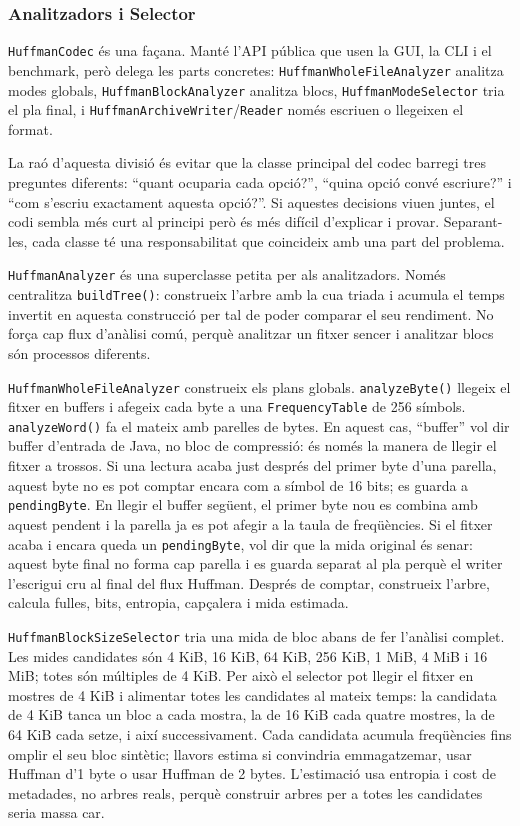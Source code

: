 \documentclass[conference,compsoc]{IEEEtran}
\begin{document}
\subsubsection{Analitzadors i Selector}

\texttt{HuffmanCodec} és una façana. Manté l'API pública que usen la GUI,
la CLI i el benchmark, però delega les parts concretes:
\texttt{HuffmanWholeFileAnalyzer} analitza modes globals,
\texttt{HuffmanBlockAnalyzer} analitza blocs, \texttt{HuffmanModeSelector}
tria el pla final, i \texttt{HuffmanArchiveWriter}/\texttt{Reader}
només escriuen o llegeixen el format.

La raó d'aquesta divisió és evitar que la classe principal del codec
barregi tres preguntes diferents: ``quant ocuparia cada opció?'', ``quina
opció convé escriure?'' i ``com s'escriu exactament aquesta opció?''. Si
aquestes decisions viuen juntes, el codi sembla més curt al principi però
és més difícil d'explicar i provar. Separant-les, cada classe té una
responsabilitat que coincideix amb una part del problema.

\texttt{HuffmanAnalyzer} és una superclasse petita per als analitzadors.
Només centralitza \texttt{buildTree()}: construeix l'arbre amb la cua triada
i acumula el temps invertit en aquesta construcció per tal de poder comparar
el seu rendiment. No força cap flux
d'anàlisi comú, perquè analitzar un fitxer sencer i analitzar blocs són
processos diferents.

\texttt{HuffmanWholeFileAnalyzer} construeix els plans globals.
\texttt{analyzeByte()} llegeix el fitxer en buffers i afegeix cada byte a
una \texttt{FrequencyTable} de 256 símbols. \texttt{analyzeWord()} fa el
mateix amb parelles de bytes. En aquest cas, ``buffer'' vol dir buffer
d'entrada de Java, no bloc de compressió: és només la manera de llegir el
fitxer a trossos. Si una lectura acaba just després del primer byte d'una
parella, aquest byte no es pot comptar encara com a símbol de 16 bits; es
guarda a \texttt{pendingByte}. En llegir el buffer següent, el primer byte
nou es combina amb aquest pendent i la parella ja es pot afegir a la
taula de freqüències. Si el fitxer acaba i encara queda un
\texttt{pendingByte}, vol dir que la mida original és senar: aquest byte
final no forma cap parella i es guarda separat al pla perquè el writer
l'escrigui cru al final del flux Huffman. Després de comptar, construeix
l'arbre, calcula fulles, bits, entropia, capçalera i mida estimada.

\texttt{HuffmanBlockSizeSelector} tria una mida de bloc abans de fer
l'anàlisi complet. Les mides candidates són 4 KiB, 16 KiB, 64 KiB,
256 KiB, 1 MiB, 4 MiB i 16 MiB; totes són múltiples de 4 KiB. Per això el
selector pot llegir el fitxer en mostres de 4 KiB i alimentar totes les
candidates al mateix temps: la candidata de 4 KiB tanca un bloc a cada
mostra, la de 16 KiB cada quatre mostres, la de 64 KiB cada setze, i així
successivament. Cada candidata acumula freqüències fins omplir el seu
bloc sintètic; llavors estima si convindria emmagatzemar, usar Huffman
d'1 byte o usar Huffman de 2 bytes. L'estimació usa entropia i cost de
metadades, no arbres reals, perquè construir arbres per a totes les
candidates seria massa car.
\end{document}
